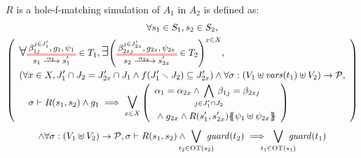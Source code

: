 \documentclass{article}
\begin{document}
\begin{defi}
\(R\) is a hole-f-matching simulation of \(A_1\) in \(A_2\) is defined as:
\begin{multline*}
	\forall s_1 \in S_1, s_2 \in S_2, \\
	\mpar{\renewcommand\arraystretch{1.4}\everymath{\displaystyle}\begin{array}{l}
		\bigsymb{\forall} \OTx{1}{}{1}{1} \in T_1, \bigsymb{\exists} \mpar{\OTx{2}{x}{2x}{2x} \in T_2}^{x \in X}, \\
		\mpar{\forall x \in X, J'_1 \cap J_2 = J'_{2x} \cap J_1 \wedge f\mpar{J'_1 \setminus J_2} \subseteq J'_{2x}} \wedge \forall \sigma: \mpar{V_1 \uplus \fvars{t_1} \uplus V_2} \to \values, \\
		\quad \sigma \vdash R\mpar{s_1, s_2} \wedge g_1 \implies \operatorname*{\bigsymb{\bigvee}}_{x \in X} \mpar{\begin{array}{l}
			\alpha_1 = \alpha_{2x} \wedge \bigwedge_\subbox{j \in J'_1 \cap J_2} \beta_{1j} = \beta_{2xj} \\
			\nwedge g_{2x} \wedge R\mpar{s'_1, s'_{2x}}\psubst{\psi_1 \uplus \psi_{2x}}
		\end{array}} \\
	\end{array}} \\
	\wedge \forall \sigma: \mpar{V_1 \uplus V_2} \to \values, \sigma \vdash R\mpar{s_1, s_2} \wedge \bigvee_\subbox{t_2 \in \fOT{s_2}} \fguard{t_2} \implies \bigvee_\subbox{t_1 \in \fOT{s_1}} \fguard{t_1}
\end{multline*}
\end{defi}
\end{document}
